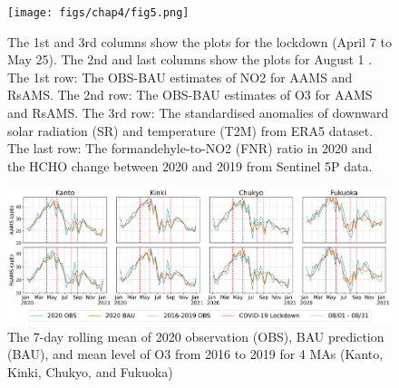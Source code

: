 \begin{figure}[p]
    \centering
    \texttt{[image: figs/chap4/fig5.png]}
    \caption[NO2, O3, SR, T2M, FNR, and HCHO variations in 2020]{The 1st and 3rd columns show the plots for the lockdown (April 7 to May 25). The 2nd and last columns show the plots for August 1 . The 1st row: The OBS-BAU estimates of NO2 for AAMS and RsAMS. The 2nd row: The OBS-BAU estimates of O3 for AAMS and RsAMS. The 3rd row: The standardised anomalies of downward solar radiation (SR) and temperature (T2M) from ERA5 dataset. The last row: The formandehyle-to-NO2 (FNR) ratio in 2020 and the HCHO change between 2020 and 2019 from Sentinel 5P data.}
    \label{fig:chap4_fig5}
\end{figure}

\begin{figure}[tbh!]
    \centering
    \includegraphics[width=\textwidth]{figs/chap4/fig6.png}
    \caption[2020 O3 mean trends (4 MAs)]{The 7-day rolling mean of 2020 observation (OBS), BAU prediction (BAU), and mean level of O3 from 2016 to 2019 for 4 MAs (Kanto, Kinki, Chukyo, and Fukuoka)}
    \label{fig:chap4_fig6}
\end{figure}

